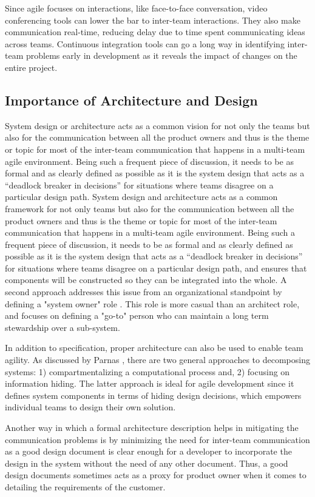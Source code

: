 Since agile focuses on interactions, like face-to-face conversation, video conferencing tools can lower the bar to inter-team interactions.
They also make communication real-time, reducing delay due to time spent communicating ideas across teams.
Continuous integration tools can go a long way in identifying inter-team problems early in development
as it reveals the impact of changes on the entire project.


\subsection{Importance of Architecture and Design}\label{sec:imp_of_dsgn}

System design or architecture acts as a common vision for not only the teams but also for the communication between all the product owners and thus is the theme or topic for most of the inter-team communication that happens in a multi-team agile environment.
Being such a frequent piece of discussion, it needs to be as formal and as clearly defined as possible as it is the system design that acts as a “deadlock breaker in decisions” \cite{architecureRole_article} for situations where teams disagree on a particular design path.
System design and architecture acts as a common framework for not only teams but also for the communication between all the product owners and thus is the theme or topic for most of the inter-team communication that happens in a multi-team agile environment.
Being such a frequent piece of discussion, it needs to be as formal and as clearly defined as possible as it is the system design that acts as a “deadlock breaker in decisions” \cite{architecureRole_article} for situations where teams disagree on a particular design path, and ensures that components will be constructed so they can be integrated into the whole.
A second approach addresses this issue from an organizational standpoint by defining a "system owner" role \cite{kniberg12}.
This role is more casual than an architect role, and focuses on defining a "go-to" person who can maintain a long term stewardship over a sub-system. 

In addition to specification, proper architecture can also be used to enable team agility.
As discussed by Parnas \cite{Parnas72}, there are two general approaches to decomposing systems: 1) compartmentalizing a computational process and, 2) focusing on information hiding.
The latter approach is ideal for agile development since it defines system components in terms of hiding design decisions, which empowers individual teams to design their own solution.

Another way in which a formal architecture description helps in mitigating the communication problems is by minimizing the need for inter-team communication as a good design document is clear enough for a developer to incorporate the design in the system without the need of any other document.
Thus, a good design documents sometimes acts as a proxy for product owner when it comes to detailing the requirements of the customer.